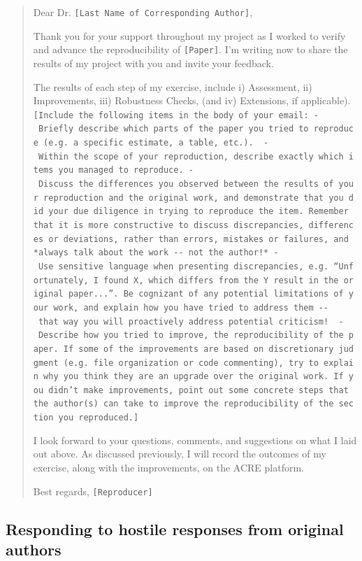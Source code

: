 \documentclass[]{book}
\begin{document}
\begin{quote}
Dear Dr. \texttt{{[}Last\ Name\ of\ Corresponding\ Author{]}},

Thank you for your support throughout my project as I worked to verify and advance the reproducibility of \texttt{{[}Paper{]}}. I'm writing now to share the results of my project with you and invite your feedback.

The results of each step of my exercise, include i) Assessment, ii) Improvements, iii) Robustness Checks, (and iv) Extensions, if applicable).
\texttt{{[}Include\ the\ following\ items\ in\ the\ body\ of\ your\ email:\ -\ Briefly\ describe\ which\ parts\ of\ the\ paper\ you\ tried\ to\ reproduce\ (e.g.\ a\ specific\ estimate,\ a\ table,\ etc.).\ \ -\ Within\ the\ scope\ of\ your\ reproduction,\ describe\ exactly\ which\ items\ you\ managed\ to\ reproduce.\ -\ Discuss\ the\ differences\ you\ observed\ between\ the\ results\ of\ your\ reproduction\ and\ the\ original\ work,\ and\ demonstrate\ that\ you\ did\ your\ due\ diligence\ in\ trying\ to\ reproduce\ the\ item.\ Remember\ that\ it\ is\ more\ constructive\ to\ discuss\ discrepancies,\ differences\ or\ deviations,\ rather\ than\ errors,\ mistakes\ or\ failures,\ and\ *always\ talk\ about\ the\ work\ -\/-\ not\ the\ author!*\ -\ Use\ sensitive\ language\ when\ presenting\ discrepancies,\ e.g.\ “Unfortunately,\ I\ found\ X,\ which\ differs\ from\ the\ Y\ result\ in\ the\ original\ paper...”.\ Be\ cognizant\ of\ any\ potential\ limitations\ of\ your\ work,\ and\ explain\ how\ you\ have\ tried\ to\ address\ them\ -\/-\ that\ way\ you\ will\ proactively\ address\ potential\ criticism!\ \ -\ Describe\ how\ you\ tried\ to\ improve,\ the\ reproducibility\ of\ the\ paper.\ If\ some\ of\ the\ improvements\ are\ based\ on\ discretionary\ judgment\ (e.g.\ file\ organization\ or\ code\ commenting),\ try\ to\ explain\ why\ you\ think\ they\ are\ an\ upgrade\ over\ the\ original\ work.\ If\ you\ didn’t\ make\ improvements,\ point\ out\ some\ concrete\ steps\ that\ the\ author(s)\ can\ take\ to\ improve\ the\ reproducibility\ of\ the\ section\ you\ reproduced.{]}}

I look forward to your questions, comments, and suggestions on what I laid out above. As discussed previously, I will record the outcomes of my exercise, along with the improvements, on the ACRE platform.

Best regards,
\texttt{{[}Reproducer{]}}
\end{quote}

\hypertarget{responding-to-hostile-responses-from-original-authors}{%
\subsection{Responding to hostile responses from original authors}\label{responding-to-hostile-responses-from-original-authors}}
\end{document}

